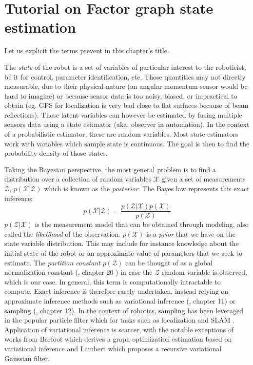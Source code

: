\chapter{Tutorial on Factor graph state estimation}
\minitoc

Let us explicit the terms prevent in this chapter's title. 

The \textit{state} of the robot is a set of variables of particular interest to the roboticist, be it for control, parameter identification, etc.
Those quantities may not directly measurable, due to their physical nature (an angular momentum sensor would be hard to imagine) or because sensor data
is too noisy, biased, or impractical to obtain (eg. GPS for localization is very bad close to flat surfaces because of beam reflections). 
Those latent variables can however be estimated by fusing multiple sensors data using a state estimator (aka. observer in automation). In the context of 
a probabilistic estimator, these are random variables. Most state estimators work with variables which sample state is continuous. The goal is then 
to find the probability density of those states.

Taking the Bayesian perspective, the most general problem is to find a distribution over a collection of random variables $\mathcal{X}$ given a set 
of measurements $\mathcal{Z}$, $p(\mathcal{X} | \mathcal{Z})$ which is known as the \textit{posterior}. 
The Bayes law represents this exact inference:
%
\begin{equation}
    p(\mathcal{X} | \mathcal{Z}) = \frac{p(\mathcal{Z} | \mathcal{X}) p(\mathcal{X})}{p(\mathcal{Z})} 
\end{equation}
%
$p(\mathcal{Z} | \mathcal{X})$ is the measurement model that can be obtained through modeling, also called the \textit{likelihood} of the observation. 
$p(\mathcal{X})$ is a \textit{prior} that we have on the state variable distribution. This may include for instance knowledge about the initial state of the robot or
an approximate value of parameters that we seek to estimate.
The \textit{partition constant} $p(\mathcal{Z})$ can be thought of as a global normalization constant (\cite{koller2009probabilistic}, chapter 20 ) in case 
the $\mathcal{Z}$ random variable is observed, which is our case. In general, this term is computationally intractable to compute. Exact inference is 
therefore rarely undertaken, instead relying on approximate inference methods such as variational inference (\cite{koller2009probabilistic}, chapter 11) 
or sampling (\cite{koller2009probabilistic}, chapter 12). In the context of robotics, sampling has been leveraged in the popular particle filter which for 
tasks such as localization \cite{dellaert1999monte} and SLAM \cite{montemerlo2002fastslam}. Application of variational inference is scarcer, with the notable 
exceptions of works from Barfoot \cite{barfoot2020exactly, wong2020variational} which derives a graph optimization estimation based on variational inference
and Lambert \cite{lambert2022recursive} which proposes a recursive variational Gaussian filter.

